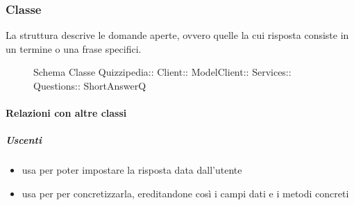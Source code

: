 \subsubsection{Classe }
La struttura descrive le domande aperte, ovvero quelle la cui risposta consiste in un termine o una frase specifici.
\begin{figure}[H]
\centering
\noindent{}
\caption[Schema Classe ShortAnswerQ]{Schema Classe Quizzipedia:: Client:: ModelClient:: Services:: Questions:: ShortAnswerQ}
\end{figure}
\paragraph{Relazioni con altre classi}
\subparagraph{Uscenti}
\begin{itemize}
\item usa  per poter impostare la risposta data dall'utente
\item usa  per per concretizzarla, ereditandone così i campi dati e i metodi concreti
\end{itemize}
